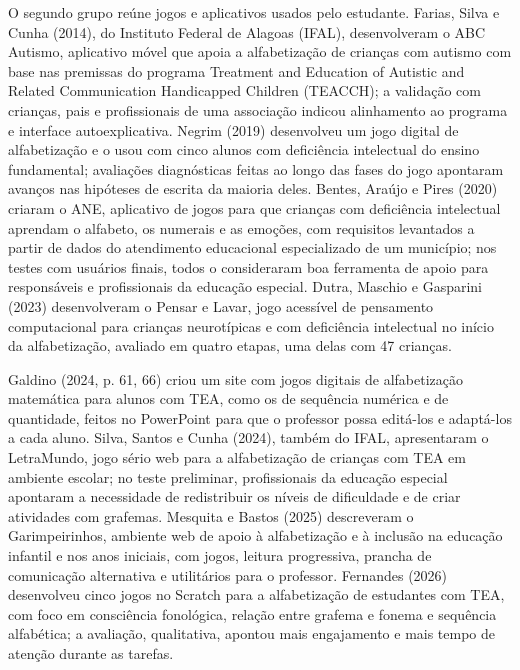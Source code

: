 O segundo grupo reúne jogos e aplicativos usados pelo estudante. Farias, Silva e Cunha (2014), do Instituto Federal de Alagoas (IFAL), desenvolveram o ABC Autismo, aplicativo móvel que apoia a alfabetização de crianças com autismo com base nas premissas do programa Treatment and Education of Autistic and Related Communication Handicapped Children (TEACCH); a validação com crianças, pais e profissionais de uma associação indicou alinhamento ao programa e interface autoexplicativa. Negrim (2019) desenvolveu um jogo digital de alfabetização e o usou com cinco alunos com deficiência intelectual do ensino fundamental; avaliações diagnósticas feitas ao longo das fases do jogo apontaram avanços nas hipóteses de escrita da maioria deles. Bentes, Araújo e Pires (2020) criaram o ANE, aplicativo de jogos para que crianças com deficiência intelectual aprendam o alfabeto, os numerais e as emoções, com requisitos levantados a partir de dados do atendimento educacional especializado de um município; nos testes com usuários finais, todos o consideraram boa ferramenta de apoio para responsáveis e profissionais da educação especial. Dutra, Maschio e Gasparini (2023) desenvolveram o Pensar e Lavar, jogo acessível de pensamento computacional para crianças neurotípicas e com deficiência intelectual no início da alfabetização, avaliado em quatro etapas, uma delas com 47 crianças.

Galdino (2024, p. 61, 66) criou um site com jogos digitais de alfabetização matemática para alunos com TEA, como os de sequência numérica e de quantidade, feitos no PowerPoint para que o professor possa editá-los e adaptá-los a cada aluno. Silva, Santos e Cunha (2024), também do IFAL, apresentaram o LetraMundo, jogo sério web para a alfabetização de crianças com TEA em ambiente escolar; no teste preliminar, profissionais da educação especial apontaram a necessidade de redistribuir os níveis de dificuldade e de criar atividades com grafemas. Mesquita e Bastos (2025) descreveram o Garimpeirinhos, ambiente web de apoio à alfabetização e à inclusão na educação infantil e nos anos iniciais, com jogos, leitura progressiva, prancha de comunicação alternativa e utilitários para o professor. Fernandes (2026) desenvolveu cinco jogos no Scratch para a alfabetização de estudantes com TEA, com foco em consciência fonológica, relação entre grafema e fonema e sequência alfabética; a avaliação, qualitativa, apontou mais engajamento e mais tempo de atenção durante as tarefas.

